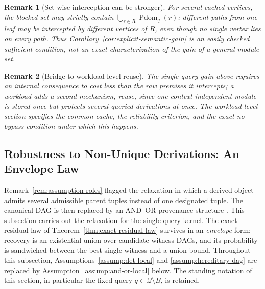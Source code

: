 \documentclass[journal]{IEEEtran}
\newtheorem{remark}{Remark}[section]
\numberwithin{equation}{section}
\begin{document}
\begin{remark}[Set-wise interception can be stronger]
\label{rem:set-wise-interception}
For several cached vertices, the blocked set may strictly contain
\(\bigcup_{r\in R}\operatorname{Pdom}_q(r)\): different paths from one
leaf may be intercepted by different vertices of \(R\), even though no
single vertex lies on every path.  Thus
Corollary~\ref{cor:explicit-semantic-gain} is an easily checked sufficient
condition, not an exact characterization of the gain of a general module
set.
\end{remark}

\begin{remark}[Bridge to workload-level reuse]
\label{rem:bridge-to-workload}
The single-query gain above requires an internal consequence to cost less
than the raw premises it intercepts; a workload adds a second mechanism,
reuse, since one context-independent module is stored once but protects
several queried derivations at once.  The workload-level section specifies
the common cache, the reliability criterion, and the exact no-bypass
condition under which this happens.
\end{remark}

\subsection{Robustness to Non-Unique Derivations: An Envelope Law}
\label{subsec:envelope-nonunique}

Remark~\ref{rem:assumption-roles} flagged the relaxation in which a derived
object admits several admissible parent tuples instead of one designated
tuple.  The canonical DAG is then replaced by an AND--OR provenance structure
\cite{green2007provenance}.  This subsection carries out the relaxation for
the single-query kernel.  The exact residual law of
Theorem~\ref{thm:exact-residual-law} survives in an \emph{envelope} form:
recovery is an existential union over candidate witness DAGs, and its
probability is sandwiched between the best single witness and a union bound.
Throughout this subsection, Assumptions~\ref{assump:det-local} and
\ref{assump:hereditary-dag} are replaced by
Assumption~\ref{assump:and-or-local} below.  The standing notation of this
section, in particular the fixed query \(q\in\mathcal Q\setminus B\), is
retained.
\end{document}
